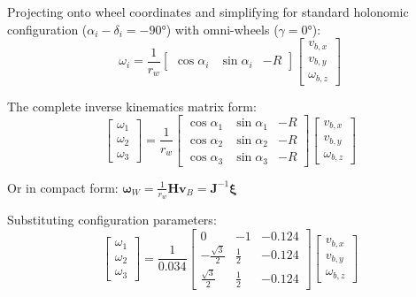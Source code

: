 Projecting onto wheel coordinates and simplifying for standard holonomic configuration ($\alpha_i - \delta_i = -90°$) with omni-wheels ($\gamma = 0°$):
\begin{equation}
\omega_i = \frac{1}{r_w} \begin{bmatrix} \cos\alpha_i & \sin\alpha_i & -R \end{bmatrix} \begin{bmatrix} v_{b,x} \\ v_{b,y} \\ \omega_{b,z} \end{bmatrix}
\label{eq:single_wheel_ik}
\end{equation}

The complete inverse kinematics matrix form:
\begin{equation}
\begin{bmatrix} \omega_1 \\ \omega_2 \\ \omega_3 \end{bmatrix} = \frac{1}{r_w} \begin{bmatrix} \cos\alpha_1 & \sin\alpha_1 & -R \\ \cos\alpha_2 & \sin\alpha_2 & -R \\ \cos\alpha_3 & \sin\alpha_3 & -R \end{bmatrix} \begin{bmatrix} v_{b,x} \\ v_{b,y} \\ \omega_{b,z} \end{bmatrix}
\label{eq:ik_general}
\end{equation}

Or in compact form: $\boldsymbol{\omega}_W = \frac{1}{r_w} \mathbf{H} \mathbf{v}_B = \mathbf{J}^{-1} \boldsymbol{\xi}$

Substituting configuration parameters:
\begin{equation}
\begin{bmatrix} \omega_1 \\ \omega_2 \\ \omega_3 \end{bmatrix} = \frac{1}{0.034} \begin{bmatrix} 0 & -1 & -0.124 \\ -\frac{\sqrt{3}}{2} & \frac{1}{2} & -0.124 \\ \frac{\sqrt{3}}{2} & \frac{1}{2} & -0.124 \end{bmatrix} \begin{bmatrix} v_{b,x} \\ v_{b,y} \\ \omega_{b,z} \end{bmatrix}
\label{eq:ik_numerical}
\end{equation}

